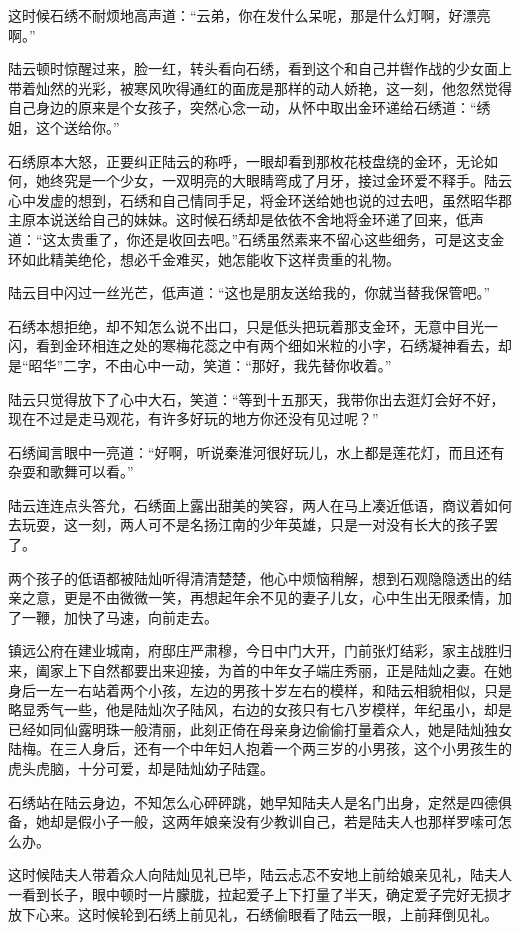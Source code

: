 这时候石绣不耐烦地高声道：“云弟，你在发什么呆呢，那是什么灯啊，好漂亮啊。”

陆云顿时惊醒过来，脸一红，转头看向石绣，看到这个和自己并辔作战的少女面上带着灿然的光彩，被寒风吹得通红的面庞是那样的动人娇艳，这一刻，他忽然觉得自己身边的原来是个女孩子，突然心念一动，从怀中取出金环递给石绣道：“绣姐，这个送给你。”

石绣原本大怒，正要纠正陆云的称呼，一眼却看到那枚花枝盘绕的金环，无论如何，她终究是一个少女，一双明亮的大眼睛弯成了月牙，接过金环爱不释手。陆云心中发虚的想到，石绣和自己情同手足，将金环送给她也说的过去吧，虽然昭华郡主原本说送给自己的妹妹。这时候石绣却是依依不舍地将金环递了回来，低声道：“这太贵重了，你还是收回去吧。”石绣虽然素来不留心这些细务，可是这支金环如此精美绝伦，想必千金难买，她怎能收下这样贵重的礼物。

陆云目中闪过一丝光芒，低声道：“这也是朋友送给我的，你就当替我保管吧。”

石绣本想拒绝，却不知怎么说不出口，只是低头把玩着那支金环，无意中目光一闪，看到金环相连之处的寒梅花蕊之中有两个细如米粒的小字，石绣凝神看去，却是“昭华”二字，不由心中一动，笑道：“那好，我先替你收着。”

陆云只觉得放下了心中大石，笑道：“等到十五那天，我带你出去逛灯会好不好，现在不过是走马观花，有许多好玩的地方你还没有见过呢？”

石绣闻言眼中一亮道：“好啊，听说秦淮河很好玩儿，水上都是莲花灯，而且还有杂耍和歌舞可以看。”

陆云连连点头答允，石绣面上露出甜美的笑容，两人在马上凑近低语，商议着如何去玩耍，这一刻，两人可不是名扬江南的少年英雄，只是一对没有长大的孩子罢了。

两个孩子的低语都被陆灿听得清清楚楚，他心中烦恼稍解，想到石观隐隐透出的结亲之意，更是不由微微一笑，再想起年余不见的妻子儿女，心中生出无限柔情，加了一鞭，加快了马速，向前走去。

镇远公府在建业城南，府邸庄严肃穆，今日中门大开，门前张灯结彩，家主战胜归来，阖家上下自然都要出来迎接，为首的中年女子端庄秀丽，正是陆灿之妻。在她身后一左一右站着两个小孩，左边的男孩十岁左右的模样，和陆云相貌相似，只是略显秀气一些，他是陆灿次子陆风，右边的女孩只有七八岁模样，年纪虽小，却是已经如同仙露明珠一般清丽，此刻正倚在母亲身边偷偷打量着众人，她是陆灿独女陆梅。在三人身后，还有一个中年妇人抱着一个两三岁的小男孩，这个小男孩生的虎头虎脑，十分可爱，却是陆灿幼子陆霆。

石绣站在陆云身边，不知怎么心砰砰跳，她早知陆夫人是名门出身，定然是四德俱备，她却是假小子一般，这两年娘亲没有少教训自己，若是陆夫人也那样罗嗦可怎么办。

这时候陆夫人带着众人向陆灿见礼已毕，陆云忐忑不安地上前给娘亲见礼，陆夫人一看到长子，眼中顿时一片朦胧，拉起爱子上下打量了半天，确定爱子完好无损才放下心来。这时候轮到石绣上前见礼，石绣偷眼看了陆云一眼，上前拜倒见礼。

